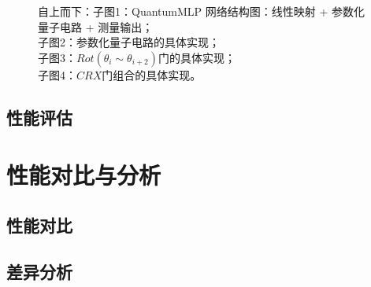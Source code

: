 \documentclass[10pt,a4paper,twoside]{article}
\numberwithin{figure}{section}%
\numberwithin{table}{section}%
\begin{document}
\begin{figure}[tb]
\caption{\centering 自上而下：子图1：QuantumMLP 网络结构图：线性映射 + 参数化量子电路 + 测量输出；\\ 子图2：参数化量子电路的具体实现；\\ 子图3：$Rot(\theta_{i}\sim\theta_{i+2})$门的具体实现；\\ 子图4：$CRX$门组合的具体实现。}
\label{fig:QuantumMLP}
\end{figure}



\subsection{性能评估}


\section{性能对比与分析}

\subsection{性能对比}

\subsection{差异分析}



\end{document}
